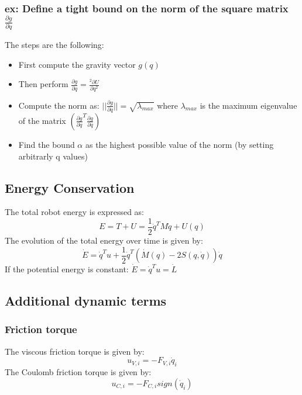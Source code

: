 \documentclass[a4paper,12pt]{article}
\begin{document}
\subsubsection{ex: Define a tight bound on the norm of the square matrix $\frac{\partial{g}}{\partial{q}}$} \label{sec:define a tight bound on the norm of the square matrix}
The steps are the following:
\begin{itemize}
    \item First compute the gravity vector $g(q)$
    \item Then perform $\frac{\partial{g}}{\partial{q}}=\frac{^2\partial{U}}{\partial{q}^2}$
    \item Compute the norm as: $||\frac{\partial{g}}{\partial{q}}||= \sqrt{\lambda_{max}}$
   where $\lambda_{max}$ is the maximum eigenvalue of the matrix $(\frac{\partial{g}}{\partial{q}}^T \frac{\partial{g}}{\partial{q}})$
    \item Find the bound $\alpha$ as the highest possible value of the norm (by setting arbitrarly q values)
\end{itemize}

\subsection{Energy Conservation}
The total robot energy is expressed as: 
\begin{equation}
    E = T + U = \frac{1}{2}\dot{q}^T M \dot{q} + U(q)
\end{equation}
The evolution of the total energy over time is given by:
\begin{equation}
    \dot{E}=\dot{q}^Tu+\frac{1}{2}\dot{q}^T(\dot{M}(q)-2S(q,\dot{q}))\dot{q}
\end{equation}
If the potential energy is constant: $\dot{E}=\dot{q}^T u = \dot{L}$
\subsection{Additional dynamic terms}
\subsubsection{Friction torque}
The viscous friction torque is given by:
\begin{equation}
    u_{V,i}=-F_{V,i}\dot{q}_i
\end{equation}
The Coulomb friction torque is given by:
\begin{equation}
    u_{C,i}=-F_{C,i}sign(\dot{q}_i)
\end{equation}
\end{document}
